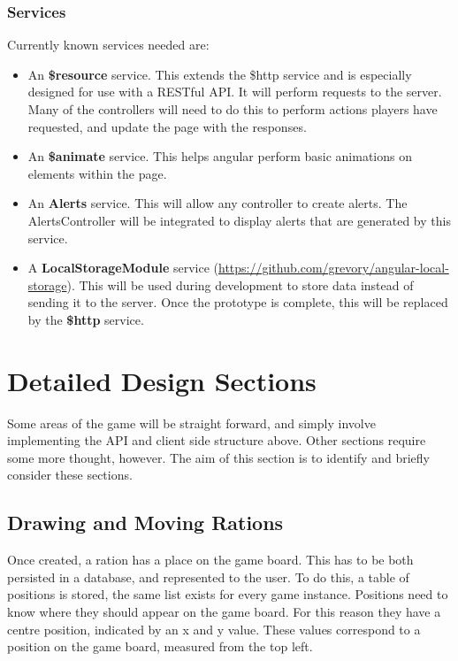 \subsubsection{Services}
Currently known services needed are:
\begin{itemize}
	\item An \textbf{\$resource} service. This extends the \$http service and is especially designed for use with a RESTful API. It will perform requests to the server. Many of the controllers will need to do this to perform actions players have requested, and update the page with the responses.
	\item An \textbf{\$animate} service. This helps angular perform basic animations on elements within the page.
	\item An \textbf{Alerts} service. This will allow any controller to create alerts. The AlertsController will be integrated to display alerts that are generated by this service.
	\item A \textbf{LocalStorageModule} service (\url{https://github.com/grevory/angular-local-storage}). This will be used during development to store data instead of sending it to the server. Once the prototype is complete, this will be replaced by the \textbf{\$http} service.
\end{itemize}

\section{Detailed Design Sections}
Some areas of the game will be straight forward, and simply involve implementing the API and client side structure above. Other sections require some more thought, however. The aim of this section is to identify and briefly consider these sections.

\subsection{Drawing and Moving Rations}
Once created, a ration has a place on the game board. This has to be both persisted in a database, and represented to the user. To do this, a table of positions is stored, the same list exists for every game instance. Positions need to know where they should appear on the game board. For this reason they have a centre position, indicated by an x and y value. These values correspond to a position on the game board, measured from the top left.

